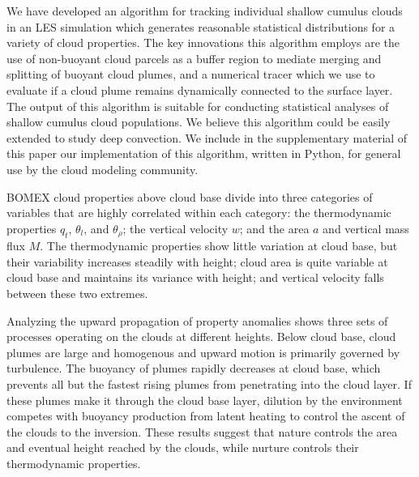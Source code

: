 \documentclass[acp]{copernicus}
\begin{document}
\conclusions
We have developed an algorithm for tracking individual shallow cumulus clouds 
in an LES simulation which generates reasonable statistical distributions for a 
variety of cloud properties.  The key innovations this algorithm employs are 
the use of non-buoyant cloud parcels as a buffer region to mediate merging and 
splitting of buoyant cloud plumes, and a numerical tracer which we use to 
evaluate if a cloud plume remains dynamically connected to the surface layer.  
The output of this algorithm is suitable for conducting statistical 
analyses of shallow cumulus cloud populations.  We believe this algorithm could 
be easily extended to study deep convection.  We include in the supplementary 
material of this paper our implementation of this algorithm, written in Python, 
for general use by the cloud modeling community.

BOMEX cloud properties above cloud base divide into three categories of 
variables that are highly correlated within each category: the thermodynamic 
properties $q_t$, $\theta_l$, and $\theta_\rho$; the vertical velocity $w$; 
and the area $a$ and vertical mass flux $M$.  The thermodynamic properties show 
little variation at cloud base, but their variability increases steadily with 
height; cloud area is quite variable at cloud base and maintains its variance 
with height; and vertical velocity falls between these two extremes.

Analyzing the upward propagation of property anomalies shows three sets of 
processes operating on the clouds at different heights.  Below cloud base, 
cloud plumes are large and homogenous and upward motion is primarily governed 
by turbulence.  The buoyancy of plumes rapidly decreases at cloud base, which 
prevents all but the fastest rising plumes from penetrating into the cloud 
layer.  If these plumes make it through the cloud base layer, dilution by the 
environment competes with buoyancy production from latent heating to control 
the ascent of the clouds to the inversion.  These results suggest that 
nature controls the area and eventual height reached by the clouds, while 
nurture controls their thermodynamic properties.

\end{document}
